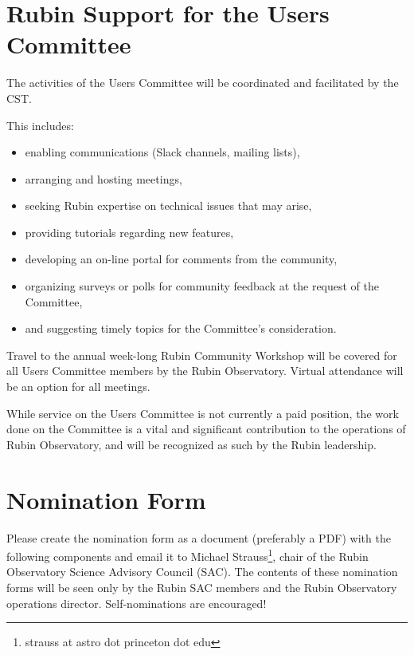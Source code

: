 \documentclass[OPS,toc]{lsstdoc}
\begin{document}
\section{Rubin Support for the Users Committee}

The activities of the Users Committee will be coordinated and facilitated by the CST.

This includes:
\begin{itemize}
\item enabling communications (Slack channels, mailing lists),
\item arranging and hosting meetings,
\item seeking Rubin expertise on technical issues that may arise,
\item providing tutorials regarding new features,
\item developing an on-line portal for comments from the community, 
\item organizing surveys or polls for community feedback at the request of the Committee, 
\item and suggesting timely topics for the Committee’s consideration.
\end{itemize}

Travel to the annual week-long Rubin Community Workshop will be covered for all Users Committee members by the Rubin Observatory.
Virtual attendance will be an option for all meetings.

While service on the Users Committee is not currently a paid position, the work done on the Committee is a vital and significant contribution to the operations of Rubin Observatory, and will be recognized as such by the Rubin leadership. 

\clearpage

\appendix

\section{Nomination Form}\label{sec:apA}

Please create the nomination form as a document (preferably a PDF) with the following components and email it to Michael Strauss\footnote{strauss at astro dot princeton dot edu}, chair of the Rubin Observatory Science Advisory Council (SAC).
The contents of these nomination forms will be seen only by the Rubin SAC members and the Rubin Observatory operations director.
Self-nominations are encouraged!
\end{document}

